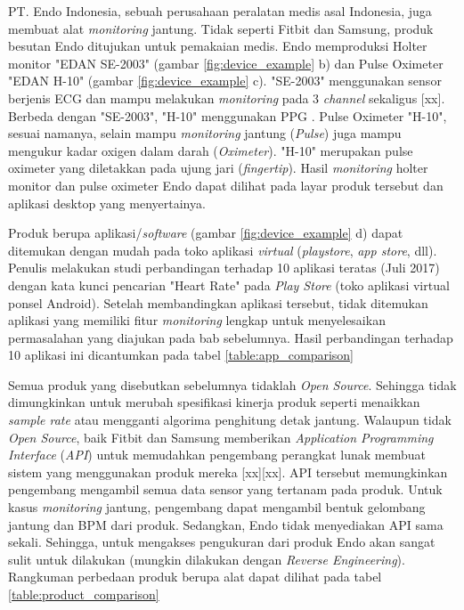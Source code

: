 PT. Endo Indonesia, sebuah perusahaan peralatan medis asal Indonesia, juga membuat alat \textit{monitoring} jantung. Tidak seperti Fitbit dan Samsung, produk besutan Endo ditujukan untuk pemakaian medis. Endo memproduksi Holter monitor "EDAN SE-2003" (gambar \ref{fig:device_example} b) dan Pulse Oximeter "EDAN H-10" (gambar \ref{fig:device_example} c). "SE-2003" menggunakan sensor berjenis ECG dan mampu melakukan \textit{monitoring} pada 3 \textit{channel} sekaligus [xx]. Berbeda dengan "SE-2003", "H-10" menggunakan PPG . Pulse Oximeter "H-10", sesuai namanya, selain mampu \textit{monitoring} jantung (\textit{Pulse}) juga mampu mengukur kadar oxigen dalam darah (\textit{Oximeter}). "H-10" merupakan pulse oximeter yang diletakkan pada ujung jari (\textit{fingertip}). Hasil \textit{monitoring} holter monitor dan pulse oximeter Endo dapat dilihat pada layar produk tersebut dan aplikasi desktop yang menyertainya.

Produk berupa aplikasi/\textit{software} (gambar \ref{fig:device_example} d) dapat ditemukan dengan mudah pada toko aplikasi \textit{virtual} (\textit{playstore}, \textit{app store}, dll). Penulis melakukan studi perbandingan terhadap 10 aplikasi teratas (Juli 2017) dengan kata kunci pencarian "Heart Rate" pada \textit{Play Store} (toko aplikasi virtual ponsel Android). Setelah membandingkan aplikasi tersebut, tidak ditemukan aplikasi yang memiliki fitur \textit{monitoring} lengkap untuk menyelesaikan permasalahan yang diajukan pada bab sebelumnya. Hasil perbandingan terhadap 10 aplikasi ini dicantumkan pada tabel \ref{table:app_comparison}

Semua produk yang disebutkan sebelumnya tidaklah \textit{Open Source}. Sehingga tidak dimungkinkan untuk merubah spesifikasi kinerja produk seperti menaikkan \textit{sample rate} atau mengganti algorima penghitung detak jantung. Walaupun tidak \textit{Open Source}, baik Fitbit dan Samsung memberikan \textit{Application Programming Interface} (\textit{API}) untuk memudahkan pengembang perangkat lunak membuat sistem yang menggunakan produk mereka [xx][xx]. API tersebut memungkinkan pengembang mengambil semua data sensor yang tertanam pada produk. Untuk kasus \textit{monitoring} jantung, pengembang dapat mengambil bentuk gelombang jantung dan BPM dari produk. Sedangkan, Endo tidak menyediakan API sama sekali. Sehingga, untuk mengakses pengukuran dari produk Endo akan sangat sulit untuk dilakukan (mungkin dilakukan dengan \textit{Reverse Engineering}). Rangkuman perbedaan produk berupa alat dapat dilihat pada tabel \ref{table:product_comparison}

